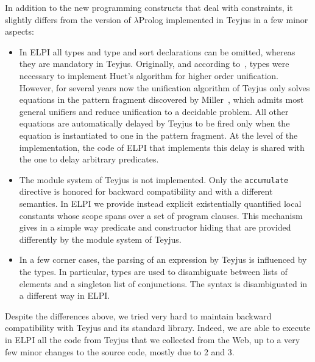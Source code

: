 \documentclass{easychair}
\begin{document}
In addition to the new programming constructs that deal with constraints, it
slightly differs from the version of $\lambda$Prolog implemented in Teyjus in a
few minor aspects:
\begin{itemize}
\item In ELPI all types and type and sort declarations can be omitted, whereas
	they are mandatory in Teyjus. Originally, and according
	to~\cite{jlp98}, types were necessary to implement Huet's algorithm for
	higher order unification. However, for several years now the
	unification algorithm of Teyjus only solves equations in the pattern
	fragment discovered by Miller~\cite{patternfrag}, which admits most
	general unifiers and reduce unification to a decidable problem. All
	other equations are automatically delayed by Teyjus to be fired only
	when the equation is instantiated to one in the pattern fragment. At
	the level of the implementation, the code of ELPI that implements this
	delay is shared with the one to delay arbitrary predicates.
\item The module system of Teyjus is not implemented. Only the
	\verb+accumulate+ directive is honored for backward compatibility and
	with a different semantics. In ELPI we provide instead explicit
	existentially quantified local constants whose scope spans over a set
	of program clauses. This mechanism gives in a simple way predicate and
	constructor hiding that are provided differently by the module system
	of Teyjus.
\item In a few corner cases, the parsing of an expression by Teyjus is
	influenced by the types. In particular, types are used to disambiguate
	between lists of elements and a singleton list of conjunctions. The
	syntax is disambiguated in a different way in ELPI.
\end{itemize}

Despite the differences above, we tried very hard to maintain backward
compatibility with Teyjus and its standard library. Indeed, we are able to
execute in ELPI all the code from Teyjus that we collected from the Web, up to
a very few minor changes to the source code, mostly due to 2 and 3.

\end{document}

